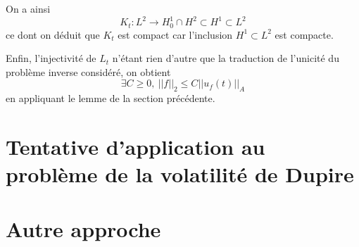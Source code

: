 \documentclass[a4paper]{book}
\begin{document}
On a ainsi
\[K_t:L^2 \longrightarrow H^1_0\cap H^2 \subset H^1 \subset L^2 \]
ce dont on déduit que $K_t$ est compact car l'inclusion $ H^1 \subset L^2$ est compacte.

Enfin, l'injectivité de $L_t$ n'étant rien d'autre que la traduction de l'unicité du problème inverse considéré, on obtient
\[\exists C\geq0,\ ||f||_2\leq C||u_f(t)||_A \]
en appliquant le lemme de la section précédente.
\chapter{Tentative d'application au problème de la volatilité de Dupire}
\chapter{Autre approche}


\end{document}
